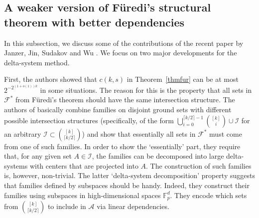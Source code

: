 \documentclass[graybox]{svmult}
\newcommand{\ff}{\mathcal{F}}
\newcommand{\m}{\mathcal}
\begin{document}
\subsection{A weaker version of F\"uredi's structural theorem with better dependencies}\label{sec63}
In this subsection, we discuss some of the contributions of the recent paper by Janzer, Jin, Sudakov and Wu \cite{JJSW}. We focus on two major developments for the delta-system method.

First, the authors showed that $c(k,s)$ in Theorem~\ref{thmfur} can be at most $2^{-2^{(1+o(1))k}}$ in some situations. The reason for this is the property that all sets in $\ff^*$ from F\"uredi's theorem should have the same intersection structure. The authors of \cite{JJSW} basically combine families on disjoint ground sets with different possible intersection structures (specifically, of the form $\bigcup_{i=0}^{\lceil k/2\rceil-1}{[k]\choose i}\cup \mathcal I$ for an arbitrary $\m I\subset {[k]\choose \lceil k/2\rceil}$) and show that essentially all sets in $\ff^*$ must come from one of such families. In order to show the `essentially' part, they require that, for any given set  $A\in \m I$, the families can be decomposed into large delta-systems with centers that are projected into $A$. The construction of such families is, however, non-trivial. The latter `delta-system decomposition' property suggests that families defined by subspaces should be handy. Indeed, they construct their families using subspaces in high-dimensional spaces $\mathbb F_p^d$. They encode which sets from ${[k]\choose \lceil k/2\rceil}$ to include in $\m A$ via linear dependencies.
\end{document}

